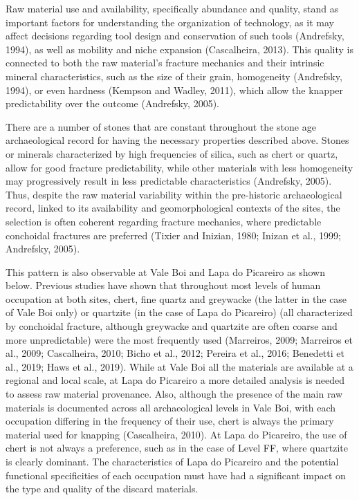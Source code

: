 \documentclass[12pt,twoside]{reedthesis}
\begin{document}
Raw material use and availability, specifically abundance and quality, stand as important factors for understanding the organization of technology, as it may affect decisions regarding tool design and conservation of such tools (Andrefsky, 1994), as well as mobility and niche expansion (Cascalheira, 2013). This quality is connected to both the raw material's fracture mechanics and their intrinsic mineral characteristics, such as the size of their grain, homogeneity (Andrefsky, 1994), or even hardness (Kempson and Wadley, 2011), which allow the knapper predictability over the outcome (Andrefsky, 2005).

There are a number of stones that are constant throughout the stone age archaeological record for having the necessary properties described above. Stones or minerals characterized by high frequencies of silica, such as chert or quartz, allow for good fracture predictability, while other materials with less homogeneity may progressively result in less predictable characteristics (Andrefsky, 2005). Thus, despite the raw material variability within the pre-historic archaeological record, linked to its availability and geomorphological contexts of the sites, the selection is often coherent regarding fracture mechanics, where predictable conchoidal fractures are preferred (Tixier and Inizian, 1980; Inizan et al., 1999; Andrefsky, 2005).

This pattern is also observable at Vale Boi and Lapa do Picareiro as shown below. Previous studies have shown that throughout most levels of human occupation at both sites, chert, fine quartz and greywacke (the latter in the case of Vale Boi only) or quartzite (in the case of Lapa do Picareiro) (all characterized by conchoidal fracture, although greywacke and quartzite are often coarse and more unpredictable) were the most frequently used (Marreiros, 2009; Marreiros et al., 2009; Cascalheira, 2010; Bicho et al., 2012; Pereira et al., 2016; Benedetti et al., 2019; Haws et al., 2019). While at Vale Boi all the materials are available at a regional and local scale, at Lapa do Picareiro a more detailed analysis is needed to assess raw material provenance. Also, although the presence of the main raw materials is documented across all archaeological levels in Vale Boi, with each occupation differing in the frequency of their use, chert is always the primary material used for knapping (Cascalheira, 2010). At Lapa do Picareiro, the use of chert is not always a preference, such as in the case of Level FF, where quartzite is clearly dominant. The characteristics of Lapa do Picareiro and the potential functional specificities of each occupation must have had a significant impact on the type and quality of the discard materials.
\end{document}
